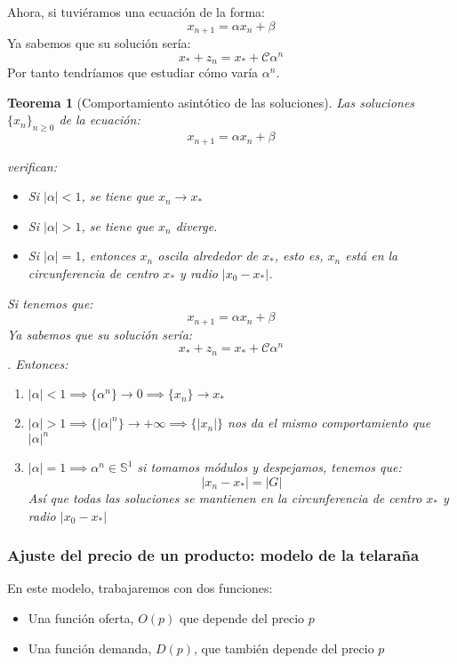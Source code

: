 \documentclass[11pt, a4paper]{article}
\makeatletter
\newif\IfInSansMode
\let\oldsf\sffamily
\renewcommand*{\sffamily}{\oldsf\mathversion{sans}\InSansModetrue}
\let\oldnorm\normalfont
\renewcommand*{\normalfont}{\oldnorm\InSansModefalse\mathversion{normal}}
\renewenvironment{proof}[1][\proofname] {\vspace{-15pt}\par\pushQED{\qed}\normalfont\topsep6\p@\@plus6\p@\relax\trivlist\item[\hskip\labelsep\it#1\@addpunct{.}]\ignorespaces}{\popQED\endtrivlist\@endpefalse}
\numberwithin{equation}{section}
\renewenvironment{proof}[1][\proofname] {\par\pushQED{\qed}\normalfont\topsep6\p@\@plus6\p@\relax\trivlist\item[\hskip\labelsep\itshape\sffamily#1\@addpunct{.}]\ignorespaces}{\popQED\endtrivlist\@endpefalse}
\theoremstyle{theorem-style}
\newtheorem{nth}{Teorema}[section]
\theoremstyle{definition-style}
\theoremstyle{remark-style}
\theoremstyle{example-style}
\newenvironment{nlist}
{\begin{enumerate}
    \renewcommand\labelenumi{(\emph{\roman{enumi})}}}
  {\end{enumerate}}
\makeatother
\begin{document}
Ahora, si tuviéramos una ecuación de la forma:
\[
x_{n+1}= \alpha x_n + \beta
\]
Ya sabemos que su solución sería:
\[
x_* +z_n = x_* + \mathcal{C}\alpha^n
\]
Por tanto tendríamos que estudiar cómo varía $\alpha^n$.


\begin{nth}[Comportamiento asintótico de las soluciones]
	Las soluciones $\{x_n\}_{n\geq0}$ de la ecuación:
\[
x_{n+1} = \alpha x_n + \beta
\]

verifican:

\begin{itemize}
\item Si $|\alpha| < 1$, se tiene que ${x_n} \to x_*$
\item Si $|\alpha| > 1$, se tiene que ${x_n}$ diverge.
\item Si $|\alpha| = 1$, entonces ${x_n}$ oscila alrededor de $x_*$, esto es, $x_n$ está en la circunferencia de centro $x_*$ y radio $|x_0 - x_*|$.
\end{itemize}\vspace{0.5cm}

	\begin{proof}
	Si tenemos que:
	\[
x_{n+1}= \alpha x_n + \beta
\]
Ya sabemos que su solución sería:
\[
x_* +z_n = x_* + \mathcal{C}\alpha^n
\]. Entonces:
\begin{nlist}
	\item $|\alpha|< 1 \implies \{\alpha^n\}\to 0 \implies \{x_n\} \to x_*$
	\item $|\alpha|> 1 \implies \{|\alpha|^n\}\to +\infty \implies \{|x_n|\}$ nos da el mismo comportamiento que $|\alpha|^n$
	\item $|\alpha| = 1 \implies \alpha^n \in \mathbb{S}^1$ si tomamos módulos y despejamos, tenemos que:
	\[
	|x_n -x_*| = |G|
	\]
	Así que todas las soluciones se mantienen en la circunferencia de centro $x_*$ y radio $|x_0-x_*|$
\end{nlist}
\end{proof}
\end{nth}

\subsubsection{Ajuste del precio de un producto: modelo de la telaraña}
En este modelo, trabajaremos con dos funciones: 
\begin{itemize}
	\item Una función oferta, $O(p)$ que depende del precio $p$
	\item Una función demanda, $D(p)$, que también depende del precio $p$
\end{itemize}
\end{document}
